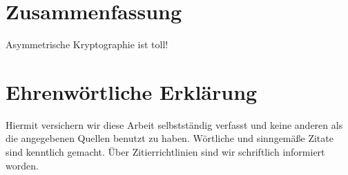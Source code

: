 \documentclass[a4paper, fontsize=12pt, parskip=full, toc=bibliographynumbered]{scrreprt}
\begin{document}
\author{}
\chapter{Zusammenfassung}

Asymmetrische Kryptographie ist toll!

\author{}
\chapter{Ehrenwörtliche Erklärung}

Hiermit versichern wir diese Arbeit selbstständig verfasst und keine
anderen als die angegebenen Quellen benutzt zu haben.  Wörtliche und
sinngemäße Zitate sind kenntlich gemacht.  Über Zitierrichtlinien
sind wir schriftlich informiert worden.

\renewcommand{\bibname}{Quellenverzeichnis}
\end{document}
